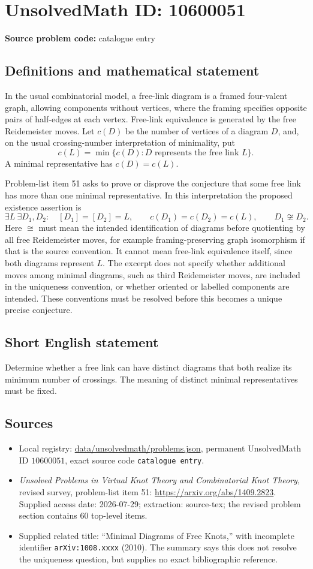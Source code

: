 \documentclass[11pt]{article}
\begin{document}
\section*{UnsolvedMath ID: 10600051}
\textbf{Source problem code:} catalogue entry
\subsection{Definitions and mathematical statement}
In the usual combinatorial model, a free-link diagram is a framed four-valent graph, allowing components without vertices, where the framing specifies opposite pairs of half-edges at each vertex. Free-link equivalence is generated by the free Reidemeister moves. Let $c(D)$ be the number of vertices of a diagram $D$, and, on the usual crossing-number interpretation of minimality, put
\[
 c(L)=\min\{c(D):D\text{ represents the free link }L\}.
\]
A minimal representative has $c(D)=c(L)$.

Problem-list item 51 asks to prove or disprove the conjecture that some free link has more than one minimal representative. In this interpretation the proposed existence assertion is
\[
 \exists L\ \exists D_1,D_2:\quad
 [D_1]=[D_2]=L,\qquad
 c(D_1)=c(D_2)=c(L),\qquad D_1\not\cong D_2.
\]
Here $\cong$ must mean the intended identification of diagrams before quotienting by all free Reidemeister moves, for example framing-preserving graph isomorphism if that is the source convention. It cannot mean free-link equivalence itself, since both diagrams represent $L$. The excerpt does not specify whether additional moves among minimal diagrams, such as third Reidemeister moves, are included in the uniqueness convention, or whether oriented or labelled components are intended. These conventions must be resolved before this becomes a unique precise conjecture.
\subsection{Short English statement}
Determine whether a free link can have distinct diagrams that both realize its minimum number of crossings. The meaning of distinct minimal representatives must be fixed.
\subsection{Sources}
\begin{itemize}
\item Local registry: \url{data/unsolvedmath/problems.json}, permanent UnsolvedMath ID $10600051$, exact source code \texttt{catalogue entry}.
\item \emph{Unsolved Problems in Virtual Knot Theory and Combinatorial Knot Theory}, revised survey, problem-list item 51: \url{https://arxiv.org/abs/1409.2823}. Supplied access date: 2026-07-29; extraction: source-tex; the revised problem section contains 60 top-level items.
\item Supplied related title: ``Minimal Diagrams of Free Knots,'' with incomplete identifier \texttt{arXiv:1008.xxxx} (2010). The summary says this does not resolve the uniqueness question, but supplies no exact bibliographic reference.
\end{itemize}
\end{document}
